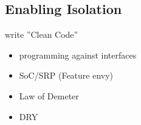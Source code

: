 \documentclass[SoftwareQuality.tex]{subfiles}
\begin{document}
\subsection*{Enabling Isolation}
\begin{frame}{write ''Clean Code''\footnotemark[1]} 
	\begin{itemize}
		\item programming against interfaces
		\item SoC/SRP (Feature envy)
		\item Law of Demeter
		\item DRY
	\end{itemize}
\end{frame}
\end{document}
